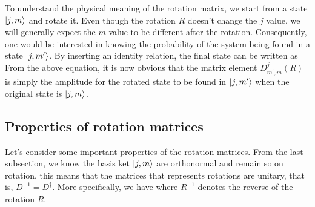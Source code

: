 To understand the physical meaning of the rotation matrix, we start from a state $| j, m \rangle$ and rotate it. Even though
the rotation $R$ doesn't change the $j$ value, we will generally expect the $m$ value to be different after the rotation. 
Consequently, one would be interested in knowing the probability of the system being found in a state $| j, m^{\prime} \rangle$. By inserting an identity relation, the final state can be written as
From the above equation, it is now obvious that the matrix element $D^{j}_{m^{\prime}, m}(R)$ is simply the amplitude for the rotated state to
be found in $| j, m^{\prime} \rangle$ when the original state is $| j, m \rangle$. 

\subsection{Properties of rotation matrices}

Let's consider some important properties of the rotation matrices. From the last subsection, we know  the basis ket 
$| j, m \rangle$ are orthonormal and remain so on rotation, this means that the matrices that represents rotations are
unitary, that is, $D^{-1} = D^{\dagger}$. More specifically, we have 
where $R^{-1}$ denotes the reverse of the rotation $R$. 


